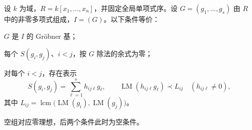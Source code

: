 \begin{theorem}[Buchberger 判据]\label{b3:thm:buchberger-criterion}
	设 \(k\) 为域，\(R=k[x_1,\ldots,x_n]\)，并固定全局单项式序。设 \(G=(g_1,\ldots,g_s)\) 由 \(R\) 中的非零多项式组成，\(I=(G)\)。以下条件等价：
	\begin{equivalences}
		\item\label{b3:item:buchberger-basis} \(G\) 是 \(I\) 的 Gröbner 基；
		\item\label{b3:item:buchberger-zero} 每个 \(S(g_i,g_j)\)、\(i<j\)，按 \(G\) 除法的余式为零；
		\item\label{b3:item:buchberger-bound} 对每个 \(i<j\)，存在表示
			\begin{equation}\label{b3:eq:s-bounded-representation}
				S(g_i,g_j)=\sum_{\ell=1}^s h_{ij\ell}g_\ell, \qquad \operatorname{LM}(h_{ij\ell}g_\ell)\prec L_{ij} \quad(h_{ij\ell}\ne0),
			\end{equation}
			其中 \(L_{ij}=\operatorname{lcm}\bigl(\operatorname{LM}(g_i),\operatorname{LM}(g_j)\bigr)\)。
	\end{equivalences}
	空组对应零理想，后两个条件此时为空条件。
\end{theorem}
